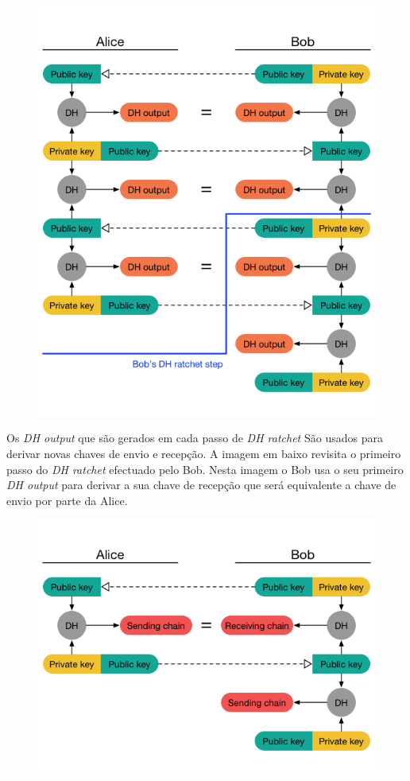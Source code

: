 \begin{figure}[H]
\begin{center}
\includegraphics[width=12cm]{img/DH4.png}
\label{diagram:DH4}
\caption{}
\centering
\end{center}
\end{figure}

Os \textit{DH output} que são gerados em cada passo de \textit{DH ratchet} São usados para derivar novas chaves de envio e recepção. A imagem em baixo revisita o primeiro passo do \textit{DH ratchet} efectuado pelo Bob. Nesta imagem o Bob usa o seu primeiro \textit{DH output} para derivar a sua chave de recepção que será equivalente a chave de envio por parte da Alice.

\begin{figure}[H]
\begin{center}
\includegraphics[width=12cm]{img/DH5.png}
\caption{}
\label{diagram:DH5}
\centering
\end{center}
\end{figure}

